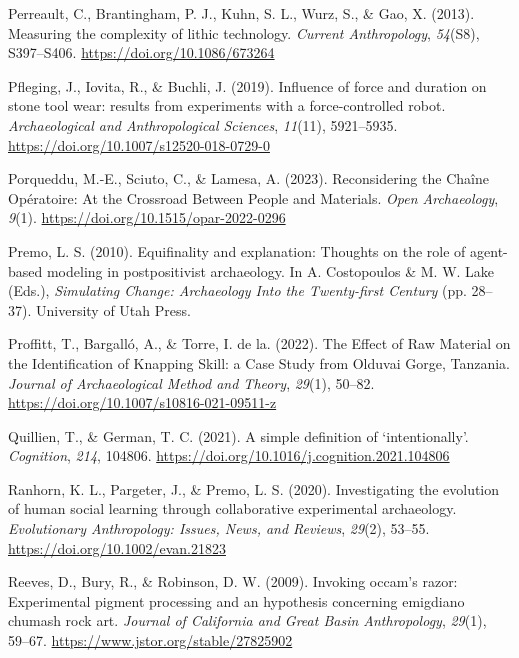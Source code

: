 \documentclass[
  11pt,
  letterpaper,
  DIV=11,
  numbers=noendperiod]{scrartcl}
\newlength{\cslhangindent}
\newenvironment{CSLReferences}[2] %
 {\begin{list}{}{%
  \setlength{\itemindent}{0pt}
  \setlength{\leftmargin}{0pt}
  \setlength{\parsep}{0pt}
  \ifodd #1
   \setlength{\leftmargin}{\cslhangindent}
   \setlength{\itemindent}{-1\cslhangindent}
  \fi
  \setlength{\itemsep}{#2\baselineskip}}}
 {\end{list}}
\begin{document}
\begin{CSLReferences}{1}{0}
Perreault, C., Brantingham, P. J., Kuhn, S. L., Wurz, S., \& Gao, X.
(2013). Measuring the complexity of lithic technology. \emph{Current
Anthropology}, \emph{54}(S8), S397--S406.
\url{https://doi.org/10.1086/673264}

Pfleging, J., Iovita, R., \& Buchli, J. (2019). Influence of force and
duration on stone tool wear: results from experiments with a
force-controlled robot. \emph{Archaeological and Anthropological
Sciences}, \emph{11}(11), 5921--5935.
\url{https://doi.org/10.1007/s12520-018-0729-0}

Porqueddu, M.-E., Sciuto, C., \& Lamesa, A. (2023). Reconsidering the
Chaîne Opératoire: At the Crossroad Between People and Materials.
\emph{Open Archaeology}, \emph{9}(1).
\url{https://doi.org/10.1515/opar-2022-0296}

Premo, L. S. (2010). Equifinality and explanation: {Thoughts} on the
role of agent-based modeling in postpositivist archaeology. In A.
Costopoulos \& M. W. Lake (Eds.), \emph{Simulating {Change}:
{Archaeology} {Into} the {Twenty}-first {Century}} (pp. 28--37).
University of Utah Press.

Proffitt, T., Bargalló, A., \& Torre, I. de la. (2022). The Effect of
Raw Material on the Identification of Knapping Skill: a Case Study from
Olduvai Gorge, Tanzania. \emph{Journal of Archaeological Method and
Theory}, \emph{29}(1), 50--82.
\url{https://doi.org/10.1007/s10816-021-09511-z}

Quillien, T., \& German, T. C. (2021). A simple definition of
{`}intentionally{'}. \emph{Cognition}, \emph{214}, 104806.
\url{https://doi.org/10.1016/j.cognition.2021.104806}

Ranhorn, K. L., Pargeter, J., \& Premo, L. S. (2020). Investigating the
evolution of human social learning through collaborative experimental
archaeology. \emph{Evolutionary Anthropology: Issues, News, and
Reviews}, \emph{29}(2), 53--55. \url{https://doi.org/10.1002/evan.21823}

Reeves, D., Bury, R., \& Robinson, D. W. (2009). Invoking occam's razor:
Experimental pigment processing and an hypothesis concerning emigdiano
chumash rock art. \emph{Journal of California and Great Basin
Anthropology}, \emph{29}(1), 59--67.
\url{https://www.jstor.org/stable/27825902}


\end{CSLReferences}
\end{document}
